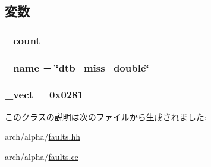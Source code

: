 \subsection{変数}
\hypertarget{classAlphaISA_1_1PDtbMissFault_a4bff925c412f331c5aaf6a39b79619ff}{
\subsubsection[{\_\-count}]{ {\bf \_\-count}}}
\label{classAlphaISA_1_1PDtbMissFault_a4bff925c412f331c5aaf6a39b79619ff}
\hypertarget{classAlphaISA_1_1PDtbMissFault_ac79073ffcd2c66a09bcd3bd3ad206019}{
\subsubsection[{\_\-name}]{ {\bf \_\-name} = \char`\"{}dtb\_\-miss\_\-double\char`\"{}}}
\label{classAlphaISA_1_1PDtbMissFault_ac79073ffcd2c66a09bcd3bd3ad206019}
\hypertarget{classAlphaISA_1_1PDtbMissFault_ad9e5855b9db0b2824cf6c507be4a872e}{
\subsubsection[{\_\-vect}]{ {\bf \_\-vect} = 0x0281}}
\label{classAlphaISA_1_1PDtbMissFault_ad9e5855b9db0b2824cf6c507be4a872e}


このクラスの説明は次のファイルから生成されました:\begin{DoxyCompactItemize}
\item 
arch/alpha/\hyperlink{arch_2alpha_2faults_8hh}{faults.hh}\item 
arch/alpha/\hyperlink{arch_2alpha_2faults_8cc}{faults.cc}\end{DoxyCompactItemize}
